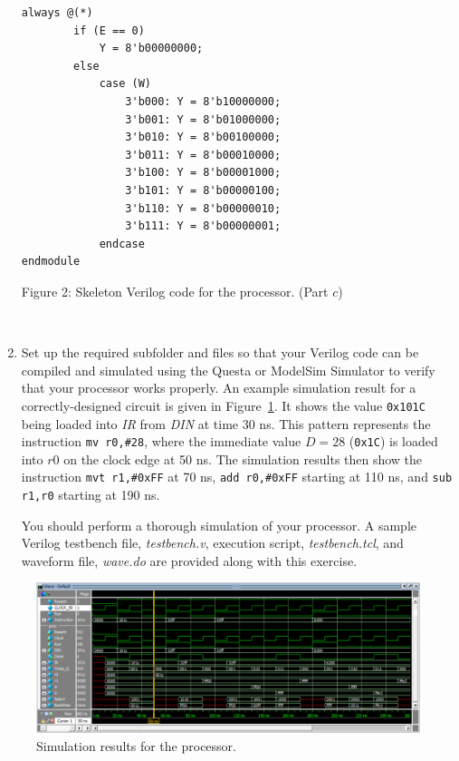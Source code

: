 \documentclass[epsfig,10pt,fullpage]{article} \addtolength{\textwidth}{1.5in}
\begin{document}
\begin{enumerate}
\begin{center}
\begin{minipage}[t]{15 cm}
\begin{lstlisting}[name=proc]
    always @(*)
        if (E == 0)
            Y = 8'b00000000;
        else
            case (W)
                3'b000: Y = 8'b10000000;
                3'b001: Y = 8'b01000000;
                3'b010: Y = 8'b00100000;
                3'b011: Y = 8'b00010000;
                3'b100: Y = 8'b00001000;
                3'b101: Y = 8'b00000100;
                3'b110: Y = 8'b00000010;
                3'b111: Y = 8'b00000001;
            endcase
endmodule
\end{lstlisting}
\end{minipage}
\end{center}

\begin{center}
Figure 2: Skeleton Verilog code for the processor. (Part $c$)
\end{center}

~\\
\item Set up the required subfolder and files so that your Verilog code can be compiled and 
simulated using the Questa or ModelSim Simulator to verify that your processor works properly. 
An example simulation result for a correctly-designed circuit 
is given in Figure~\ref{fig:fig3}.  It shows the value \texttt{0x101C} being loaded into {\it IR} 
from {\it DIN} at time 30 ns. This pattern represents the instruction \texttt{mv r0,\#28}, 
where the immediate value $D = 28$ (\texttt{0x1C}) is loaded into $r0$ on the clock edge at 50 ns. 
The simulation results then show the instruction \texttt{mvt~r1,\#0xFF} at 70 ns, 
\texttt{add r0,\#0xFF} starting at 110 ns, and \texttt{sub r1,r0} starting at 190 ns.

You should perform a thorough simulation of your processor. A 
sample Verilog testbench file, {\it testbench.v}, execution script, {\it testbench.tcl}, 
and waveform file, {\it wave.do} are provided along with this exercise.
\end{enumerate}
\begin{figure}[H]
	\begin{center}
		\includegraphics[width=\textwidth]{figures/figure3.png}
	\end{center}
	\caption{Simulation results for the processor.}
	\label{fig:fig3}
\end{figure}
\vspace{-1cm}
\end{document}

